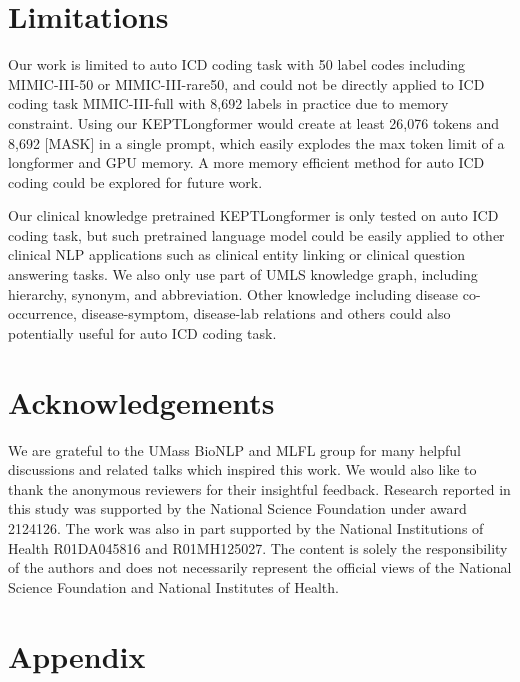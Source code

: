 \documentclass[11pt]{article}
\begin{document}
\section{Limitations}
\label{sec:Limitations}

Our work is limited to auto ICD coding task with 50 label codes including MIMIC-III-50 or MIMIC-III-rare50, and could not be directly applied to ICD coding task MIMIC-III-full with 8,692 labels in practice due to memory constraint. Using our KEPTLongformer would create at least 26,076 tokens and 8,692 [MASK] in a single prompt, which easily explodes the max token limit of a longformer and GPU memory.
A more memory efficient method for auto ICD coding could be explored for future work.



Our clinical knowledge pretrained KEPTLongformer is only tested on auto ICD coding task, but such pretrained language model could be easily applied to other clinical NLP applications such as clinical entity linking or clinical question answering tasks. 
We also only use part of UMLS knowledge graph, including hierarchy, synonym, and abbreviation. Other knowledge including disease co-occurrence, disease-symptom, disease-lab relations and others could also potentially useful for auto ICD coding task. 



\section*{Acknowledgements}
We are grateful to the UMass BioNLP and MLFL group for many helpful discussions and related talks which inspired this work. We would also like to thank the anonymous reviewers for their insightful feedback. Research reported in this study was supported by the National Science Foundation under award 2124126. The work was also in part supported by the National Institutions of Health R01DA045816 and R01MH125027. The content is solely the responsibility of the authors and does not necessarily represent the official views of the National Science Foundation and National Institutes of Health.






\newpage
\appendix
\renewcommand\thefigure{\thesection.\arabic{figure}}  
\renewcommand\thetable{\thesection.\arabic{table}}

\section{Appendix}
\setcounter{figure}{0}
\setcounter{table}{0}
\end{document}
